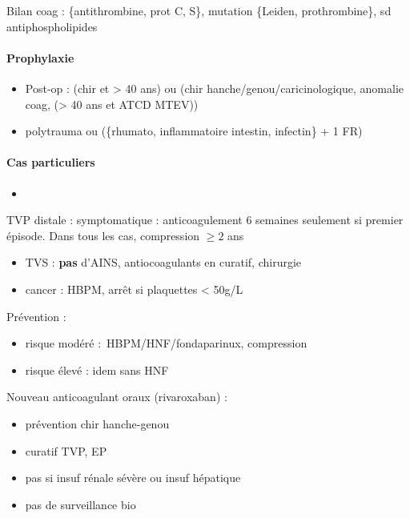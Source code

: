 \documentclass[11pt]{article}
\begin{document}
Bilan coag : \{antithrombine, prot C, S\}, mutation \{Leiden, prothrombine\}, sd
antiphospholipides

\paragraph{Prophylaxie}
\label{sec:orga7e6962}

\begin{itemize}
\item Post-op : (chir et > 40 ans) ou (chir hanche/genou/caricinologique, anomalie
coag, (> 40 ans et ATCD MTEV))
\item polytrauma ou (\{rhumato, inflammatoire intestin, infectin\} + 1 FR)
\end{itemize}



\paragraph{Cas particuliers}
\label{sec:org202f2b1}

\begin{itemize}
\item 
\end{itemize}
TVP distale : symptomatique : anticoagulement 6 semaines seulement si premier épisode. Dans tous les cas,
compression \(\ge 2\) ans
\begin{itemize}
\item \gls{TVS} : \textbf{pas} d'AINS, antiocoagulants en curatif, chirurgie
\item cancer : HBPM, arrêt si plaquettes < 50g/L
\end{itemize}

Prévention : 

\begin{itemize}
\item risque modéré : HBPM/HNF/fondaparinux, compression
\item risque élevé : idem sans HNF
\end{itemize}


Nouveau anticoagulant oraux (rivaroxaban) :

\begin{itemize}
\item prévention chir hanche-genou
\item curatif TVP, EP
\item pas si insuf rénale sévère ou insuf hépatique
\item pas de surveillance bio
\end{itemize}
\end{document}
